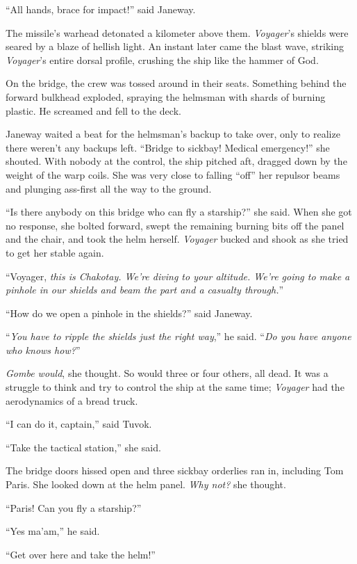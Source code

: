 \documentclass[twoside,letterpaper,12pt]{memoir}
\begin{document}
``All hands, brace for impact!'' said Janeway.

The missile's warhead detonated a kilometer above them. \textit{Voyager}'s shields were seared by a blaze of hellish light. An instant later came the blast wave, striking \textit{Voyager}'s entire dorsal profile, crushing the ship like the hammer of God.

On the bridge, the crew was tossed around in their seats. Something behind the forward bulkhead exploded, spraying the helmsman with shards of burning plastic. He screamed and fell to the deck.

Janeway waited a beat for the helmsman's backup to take over, only to realize there weren't any backups left. ``Bridge to sickbay! Medical emergency!'' she shouted. With nobody at the control, the ship pitched aft, dragged down by the weight of the warp coils. She was very close to falling ``off'' her repulsor beams and plunging ass-first all the way to the ground.

``Is there anybody on this bridge who can fly a starship?'' she said. When she got no response, she bolted forward, swept the remaining burning bits off the panel and the chair, and took the helm herself. \textit{Voyager} bucked and shook as she tried to get her stable again.

``Voyager, \textit{this is Chakotay. We're diving to your altitude. We're going to make a pinhole in our shields and beam the part and a casualty through.}''

``How do we open a pinhole in the shields?'' said Janeway.

``\textit{You have to ripple the shields just the right way},'' he said. ``\textit{Do you have anyone who knows how?}''

\textit{Gombe would}, she thought. So would three or four others, all dead. It was a struggle to think and try to control the ship at the same time; \textit{Voyager} had the aerodynamics of a bread truck.

``I can do it, captain,'' said Tuvok.

``Take the tactical station,'' she said.

The bridge doors hissed open and three sickbay orderlies ran in, including Tom Paris. She looked down at the helm panel. \textit{Why not?} she thought.

``Paris! Can you fly a starship?''

``Yes ma'am,'' he said.

``Get over here and take the helm!''
\end{document}
